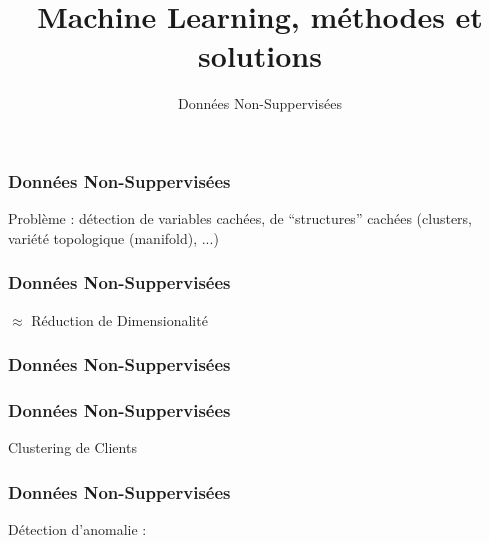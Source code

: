 \documentclass{formation}
\title{Machine Learning, méthodes et solutions}
\subtitle{Données Non-Suppervisées}
\begin{document}
\maketitle

\begin{frame}
  \frametitle{Données Non-Suppervisées}
  Problème : détection de variables cachées, de ``structures'' cachées (clusters, variété topologique (manifold), ...) \\ $\;$ \\
  \begin{minipage}[l]{0.69\linewidth}
  \end{minipage}\hfill
  \begin{minipage}[l]{0.29\linewidth}
  \end{minipage}\hfill
\end{frame}

\begin{frame}
  \frametitle{Données Non-Suppervisées}
  \begin{center}
    $\approx$ Réduction de Dimensionalité
  \end{center}
\end{frame}

\begin{frame}
  \frametitle{Données Non-Suppervisées}
  \begin{minipage}[l]{0.69\linewidth}
  \end{minipage}\hfill
  \begin{minipage}[l]{0.29\linewidth}
  \end{minipage}\hfill
\end{frame}

\begin{frame}
  \frametitle{Données Non-Suppervisées}
  Clustering de Clients
\end{frame}

\begin{frame}
  \frametitle{Données Non-Suppervisées}
  Détection d'anomalie :
\end{frame}
\end{document}

